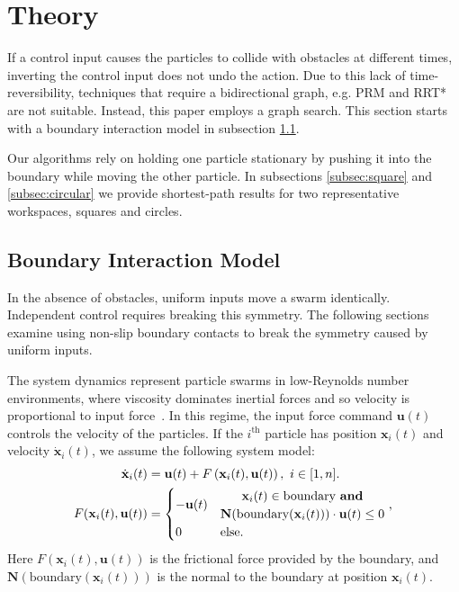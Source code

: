 \section{Theory}
\label{sec:theory}
If a control input causes the particles to collide with obstacles at different times, inverting the control input does not undo the action. Due to this lack of time-reversibility, techniques that require a bidirectional graph, e.g. PRM \cite{kavraki1996probabilistic} and RRT* \cite{lavalle2006planning} are not suitable. Instead, this paper employs a graph search. This section starts with a boundary interaction model in subsection \ref{subsec:WallFriction}.

Our algorithms rely on holding one particle stationary by pushing it into the boundary while moving the other particle. In subsections \ref{subsec:square} and \ref{subsec:circular} we provide shortest-path results for two representative workspaces, squares and circles.
\subsection{Boundary Interaction Model}\label{subsec:WallFriction}

In the absence of obstacles, uniform inputs move a swarm identically.  
Independent control requires breaking this symmetry. 
The following sections examine using non-slip boundary contacts to break the symmetry caused by uniform inputs.  
 
 The system dynamics represent particle swarms in low-Reynolds number environments, where viscosity dominates inertial forces and so velocity is proportional to input force~\cite{Purcell1977}. 
 In this regime, the input force command $\mathbf{u}(t)$ controls the velocity of the particles.  
 If the $i^{\textrm{th}}$ particle has position $\mathbf{x}_i(t)$ and velocity $\dot{\mathbf{x}}_i(t)$,  we assume the following system model:
 \begin{align}\label{eq:swarmDynamicsAndFric} 
\dot{\mathbf{x}}_i(t)
 &=
 \mathbf{u}(t)
 +F \left( \mathbf{x}_i(t), \mathbf{u}(t) \right), ~i \in [1,n].\\
 F(\mathbf{x}_i(t), \mathbf{u}(t)) &= \begin{cases}
  - \mathbf{u}(t) &\begin{matrix} \mathbf{x}_i(t) \in  \textrm{boundary \textbf{and}}\\
\mathbf{N}(\textrm{boundary$(\mathbf{x}_i(t))$})\cdot   \mathbf{u}(t) \le 0 \end{matrix}
\textrm{    ,} \\
 0 & \textrm{else}.
 \end{cases}\nonumber
 \end{align}
 Here  $F(\mathbf{x}_i(t), \mathbf{u}(t)) $ is the frictional force provided by the boundary, and
 $\mathbf{N}(\textrm{boundary$(\mathbf{x}_i(t))$})$ is the normal to the boundary at position $\mathbf{x}_i(t)$.
 
